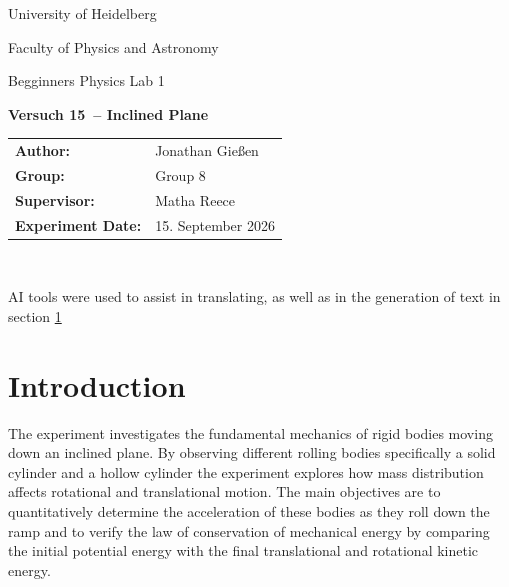 \documentclass[12pt,a4paper,titlepage]{scrartcl}
\numberwithin{equation}{section}
\numberwithin{table}{section}
\numberwithin{figure}{section}
\newcommand{\versuch}{Versuch 15}
\newcommand{\titel}{Inclined Plane}
\newcommand{\praktikum}{Begginners Physics Lab 1}
\newcommand{\autor}{Jonathan Gießen}
\newcommand{\gruppe}{Group 8}
\newcommand{\datum}{15. September 2026}
\newcommand{\betreuer}{Matha Reece}
\begin{document}
\pagestyle{scrheadings}

\begin{titlepage}



    \centering
    \vspace*{4cm}
    {\large University of Heidelberg\par}
    {\small Faculty of Physics and Astronomy\par}
    {\Large \praktikum\par}
    \vspace{0.8cm}
    {\LARGE \bfseries \versuch\ -- \titel\par}
    \vspace{1.5cm}

    \begin{tabular}{ll}
        \textbf{Author:} & \autor\\
        \textbf{Group:} & \gruppe\\
        \textbf{Supervisor:} & \betreuer\\
        \textbf{Experiment Date:} & \datum\\
    \end{tabular}

    \vfill
    \hrulefill\
\end{titlepage}

\tableofcontents

\bigskip
\begin{tcolorbox}[colback=gray!5,colframe=gray!60,boxrule=0.8pt,arc=0.01mm,title=AI-Disclaimer]
    AI tools were used to assist in translating, as well as in the generation of text in section \ref{sec:Einleitung}
\end{tcolorbox}

\clearpage



\section{Introduction}\label{sec:Einleitung}
The experiment investigates the fundamental mechanics of rigid bodies moving down an inclined plane. By observing different rolling bodies specifically a solid cylinder and a hollow cylinder the experiment explores how mass distribution affects rotational and translational motion. The main objectives are to quantitatively determine the acceleration of these bodies as they roll down the ramp and to verify the law of conservation of mechanical energy by comparing the initial potential energy with the final translational and rotational kinetic energy.
\end{document}
